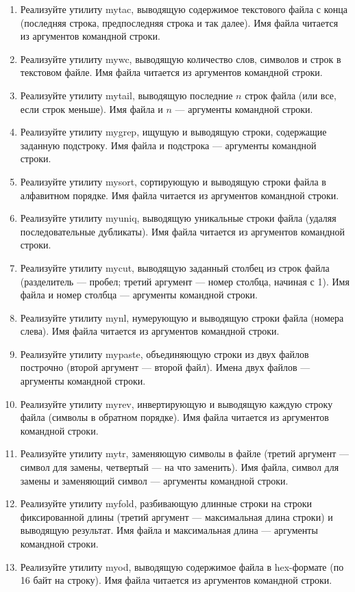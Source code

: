 \documentclass[12pt]{article}
\begin{document}
\begin{enumerate}
    \item Реализуйте утилиту mytac, выводящую содержимое текстового файла с конца (последняя строка, предпоследняя строка и так далее). Имя файла читается из аргументов командной строки.
    \item Реализуйте утилиту mywc, выводящую количество слов, символов и строк в текстовом файле. Имя файла читается из аргументов командной строки.
    \item Реализуйте утилиту mytail, выводящую последние $n$ строк файла (или все, если строк меньше). Имя файла и $n$ — аргументы командной строки.
    \item Реализуйте утилиту mygrep, ищущую и выводящую строки, содержащие заданную подстроку. Имя файла и подстрока — аргументы командной строки.
    \item Реализуйте утилиту mysort, сортирующую и выводящую строки файла в алфавитном порядке. Имя файла читается из аргументов командной строки.
    \item Реализуйте утилиту myuniq, выводящую уникальные строки файла (удаляя последовательные дубликаты). Имя файла читается из аргументов командной строки.
    \item Реализуйте утилиту mycut, выводящую заданный столбец из строк файла (разделитель — пробел; третий аргумент — номер столбца, начиная с 1). Имя файла и номер столбца — аргументы командной строки.
    \item Реализуйте утилиту mynl, нумерующую и выводящую строки файла (номера слева). Имя файла читается из аргументов командной строки.
    \item Реализуйте утилиту mypaste, объединяющую строки из двух файлов построчно (второй аргумент — второй файл). Имена двух файлов — аргументы командной строки.
    \item Реализуйте утилиту myrev, инвертирующую и выводящую каждую строку файла (символы в обратном порядке). Имя файла читается из аргументов командной строки.
    \item Реализуйте утилиту mytr, заменяющую символы в файле (третий аргумент — символ для замены, четвертый — на что заменить). Имя файла, символ для замены и заменяющий символ — аргументы командной строки.
    \item Реализуйте утилиту myfold, разбивающую длинные строки на строки фиксированной длины (третий аргумент — максимальная длина строки) и выводящую результат. Имя файла и максимальная длина — аргументы командной строки.
    \item Реализуйте утилиту myod, выводящую содержимое файла в hex-формате (по 16 байт на строку). Имя файла читается из аргументов командной строки.

\end{enumerate}
\end{document}
